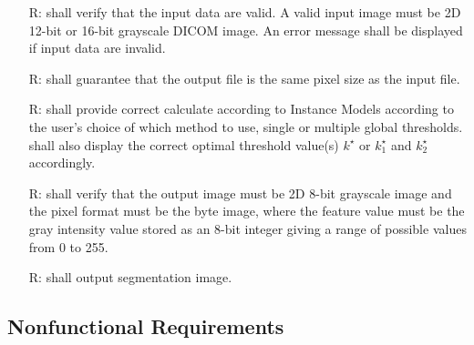 \documentclass[12pt]{article}
\begin{document}
\noindent \begin{itemize}

\item[R\refstepcounter{reqnum}\thereqnum \label{R_Inputs}:] 
\famname{} shall verify that the input data are valid. A valid input image must be 2D 12-bit or 16-bit grayscale DICOM image. An error message shall be displayed if input data are invalid.

\item[R\refstepcounter{reqnum}\thereqnum \label{R_OutputInputs}:] 
\famname{} shall guarantee that the output file is the same pixel size as the input file.

\item[R\refstepcounter{reqnum}\thereqnum \label{R_Calculate}:]
\famname{} shall provide correct calculate according to Instance Models according to the user's choice of which method to use, single or multiple global thresholds. \famname{} shall also display the correct optimal threshold value(s) $k^{\star}$ or $k^{\star}_{1}$ and $k^{\star}_{2}$ accordingly. 

\item[R\refstepcounter{reqnum}\thereqnum \label{R_VerifyOutput}:]
\famname{} shall verify that the output image must be 2D 8-bit grayscale image and the pixel format must be the byte image, where the feature value must be the gray intensity value stored as an 8-bit integer giving a range of possible values from 0 to 255.

\item[R\refstepcounter{reqnum}\thereqnum \label{R_Outputk}:] 
\famname{} shall output segmentation image.

\end{itemize}

\subsection{Nonfunctional Requirements}
\end{document}
